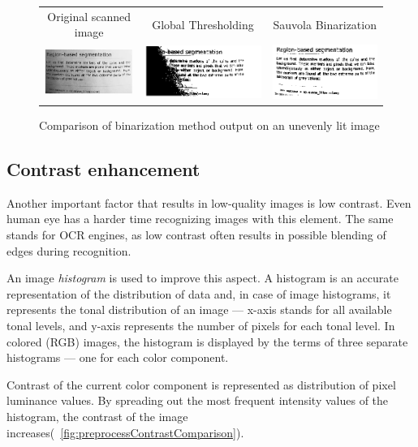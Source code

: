 \begin{figure}
\centering
{\sffamily
\begin{tabular}{ccc}
Original scanned image &
Global Thresholding &
Sauvola Binarization \\
\includegraphics[width=.3\linewidth]{img/preprocessing/bin_orig.png} &
\includegraphics[width=.3\linewidth]{img/preprocessing/bin_glob.png} &
\includegraphics[width=.3\linewidth]{img/preprocessing/bin_sauvola.png}
\end{tabular}
}
\caption{Comparison of binarization method output on an unevenly lit image}
\label{fig:preprocessBinarization}
\end{figure}

\subsection{Contrast enhancement}


Another important factor that results in low-quality images is low contrast. Even human eye has a harder time recognizing images with this element. The same stands for OCR engines, as low contrast often results in possible blending of edges during recognition.

An image \emph{histogram} is used to improve this aspect. A histogram is an accurate representation of the distribution of data and, in case of image histograms, it represents the tonal distribution of an image --- x-axis stands for all available tonal levels, and y-axis represents the number of pixels for each tonal level. In colored (RGB) images, the histogram is displayed by the terms of three separate histograms --- one for each color component.

Contrast of the current color component is represented as distribution of pixel luminance values. By spreading out the most frequent intensity values of the histogram, the contrast of the image increases(~\cref{fig:preprocessContrastComparison}).

